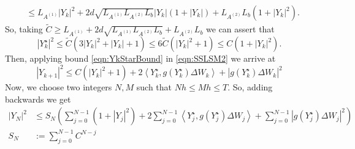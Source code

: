 \documentclass[3p]{elsarticle}
\theoremstyle{definition}
\theoremstyle{plain}%
\theoremstyle{remark}
\newcommand{\innerprod}[2]{\left\langle#1, #2\right\rangle}
\begin{document}
\begin{pf}
\begin{align*}
		&\leq
			L_{A^{(1)}} |Y_k|^2
			+ 2 d \sqrt{L_{A^{(1)}} L_{A^{(2)}} L_b }|Y_k|(1+|Y_k|)
			+L_{A^{(2)}} L_b (1+|Y_k|^2).
	\end{align*}
	So, taking $\widetilde{C}\geq L_{A^{(1)}}+ 2 d \sqrt{L_{A^{(1)}} L_{A^{(2)}} L_b} + L_{A^{(2)}} L_b$ we can assert 
	that
	\begin{equation}\label{eqn:YkStarBound}
		|Y^{\star}_k|^2
			\leq 
				\widetilde{C}(3|Y_k|^2+|Y_k| + 1) 
			\leq 
				6\widetilde{C}\left(
					|Y_k|^2+1
				\right)
			\leq C(1+|Y_k|^2).
	\end{equation} 
	Then, applying bound \eqref{eqn:YkStarBound} in \cref{eqn:SSLSM2} we arrive at
	\begin{equation*}
		|Y_{k+1}|^2
		\leq
			C \left(
				|Y_k|^2 + 1
			\right)
			+ 2\innerprod{Y^{\star}_k}{g(Y^{\star}_k) \Delta W_k}
			+ \left|g(Y^{\star}_k) \Delta W_k \right|^2
	\end{equation*}
	Now, we choose two integers $N,M$ such that $Nh\leq Mh \leq T$. So, adding backwards we get
	\begin{align*}
		|Y_N|^2
			&\leq
			S_N\left(
				\sum_{j=0}^{N-1}
					(1+|Y_j|^2)
				+
				2\sum_{j=0}^{N-1}
					\innerprod{Y_j^{\star}}{g(Y_j^{\star}) \Delta W_j}
				+
				\sum_{j=0}^{N-1}
					\left|
						g(Y_j^{\star}) \Delta W_j
					\right|^2
			\right)\\
			S_N
				&:=
				\sum_{j=0}^{N-1}
					C^{N-j} 			
	\end{align*}


\end{pf}
\end{document}
